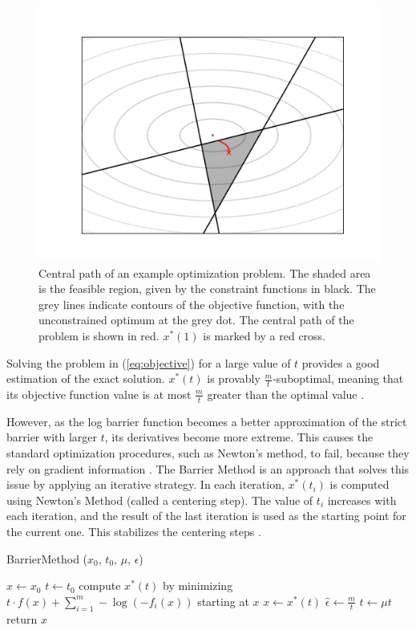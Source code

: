 \documentclass[12pt, a4paper]{report}
\begin{document}
\begin{figure}
    \centering
    \includegraphics[scale=0.6]{barrier_method_example.png}
    \caption{Central path of an example optimization problem. The shaded area is the feasible region, given by the constraint functions in black. The grey lines indicate contours of the objective function, with the unconstrained optimum at the grey dot. The central path of the problem is shown in red. $x^*(1)$ is marked by a red cross.}
    \label{fig:barrier_method_example}
\end{figure}

Solving the problem in (\ref{eq:objective}) for a large value of $t$ provides a good estimation of the exact solution.
$x^*(t)$ is provably $\frac{m}{t}$-suboptimal, meaning that its objective function value is at most $\frac{m}{t}$ greater than the optimal value \cite{boyd}.

However, as the log barrier function becomes a better approximation of the strict barrier with larger $t$, its derivatives become more extreme.
This causes the standard optimization procedures, such as Newton's method, to fail, because they rely on gradient information \cite[564]{boyd}.
The Barrier Method is an approach that solves this issue by applying an iterative strategy.
In each iteration, $x^*(t_i)$ is computed using Newton's Method (called a centering step).
The value of $t_i$ increases with each iteration, and the result of the last iteration is used as the starting point for the current one.
This stabilizes the centering steps \cite[569]{boyd}.

\begin{algorithm}
    \caption[The basic Barrier Method.]{BarrierMethod ($x_0$, $t_0$, $\mu$, $\epsilon$)}
    \label{alg:product_axes}
    \begin{algorithmic}
        \State $x \gets x_0$
        \State $t \gets t_0$
        \Repeat
            \State compute $x^*(t)$ by minimizing $t \cdot f(x) + \sum_{i=1}^m -\log(-f_i(x))$ starting at $x$
            \State $x \gets x^*(t)$
            \State $\hat{\epsilon} \gets \frac{m}{t}$
            \State $t \gets \mu t$
        \Until{$\hat{\epsilon} < \epsilon$}
        \State return $x$
    \end{algorithmic}
\end{algorithm}
\end{document}
